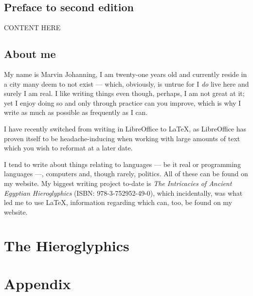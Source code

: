 \documentclass[a5paper,twoside,12pt]{report}
\begin{document}
\tableofcontents
\newpage

\chapter*{Preface to second edition}
	CONTENT HERE

	\newpage

	\chapter*{About me}

		My name is Marvin Johanning, I am twenty-one years old and currently reside in a city many deem to not exist — which, obviously, is untrue for I \textit{do} live here and surely I am real. I like writing things even though, perhaps, I am not great at it; yet I enjoy doing so and only through practice can you improve, which is why I write as much as possible as frequently as I can.

		I have recently switched from writing in LibreOffice to \LaTeX, as LibreOffice has proven itself to be headache-inducing when working with large amounts of text which you wish to reformat at a later date. 

		I tend to write about things relating to languages — be it real or programming languages —, computers and, though rarely, politics. All of these can be found on my website. My biggest writing project to-date is \textit{The Intricacies of Ancient Egyptian Hieroglyphics} (ISBN: 978-3-752952-49-0), which incidentally, was what led me to use \LaTeX, information regarding which can, too, be found on my website.
		\newpage


\thispagestyle{empty}
  \mbox{}
  \newpage

\part*{The Hieroglyphics}
  \newpage

\thispagestyle{empty}
  \mbox{}
  \newpage





\part*{Appendix}
  \newpage
  \printbibliography
\end{document}
